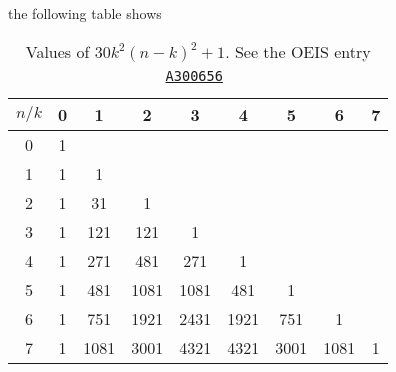 \begin{examp}
    the following table shows
    \begin{table}[H]
        \setlength\extrarowheight{-6pt}
        \begin{tabular}{c|cccccccc}
            $n/k$ & 0 & 1    & 2    & 3    & 4    & 5    & 6    & 7 \\
            \hline
            0     & 1 &      &      &      &      &      &      &   \\
            1     & 1 & 1    &      &      &      &      &      &   \\
            2     & 1 & 31   & 1    &      &      &      &      &   \\
            3     & 1 & 121  & 121  & 1    &      &      &      &   \\
            4     & 1 & 271  & 481  & 271  & 1    &      &      &   \\
            5     & 1 & 481  & 1081 & 1081 & 481  & 1    &      &   \\
            6     & 1 & 751  & 1921 & 2431 & 1921 & 751  & 1    &   \\
            7     & 1 & 1081 & 3001 & 4321 & 4321 & 3001 & 1081 & 1
        \end{tabular}
        \caption{Values of $30k^2(n-k)^2 + 1$.
        See the OEIS entry \href{https://oeis.org/A300656}{\texttt{A300656}}~\cite{kolosov2018fifth}}
        \label{tab:row-sums-gives-fifth-power}
    \end{table}
\end{examp}
